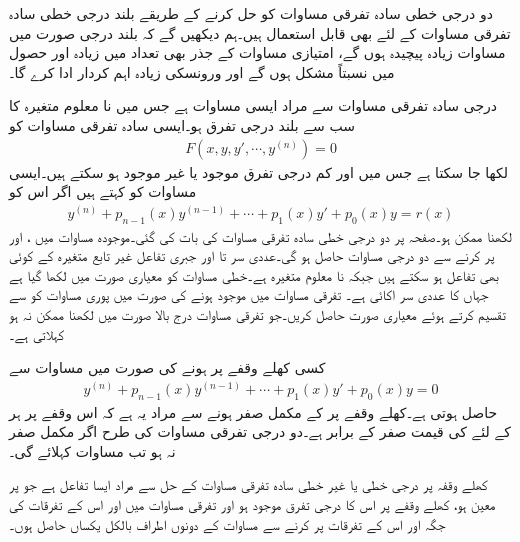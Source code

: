 دو درجی خطی سادہ تفرقی مساوات کو حل کرنے کے طریقے بلند درجی خطی سادہ تفرقی مساوات کے لئے بھی قابل استعمال ہیں۔ہم دیکھیں گے کہ بلند درجی صورت میں مساوات زیادہ پیچیدہ ہوں گے،  امتیازی مساوات کے جذر بھی تعداد میں زیادہ اور حصول میں نسبتاً مشکل ہوں گے اور ورونسکی زیادہ اہم کردار ادا کرے گا۔ 

 درجی سادہ تفرقی مساوات سے مراد ایسی مساوات ہے جس میں نا معلوم متغیرہ  کا  سب سے بلند درجی تفرق ہو۔ایسی سادہ تفرقی مساوات کو
\begin{align*}
F(x,y,y',\cdots, y^{(n)})=0
\end{align*}
لکھا جا سکتا ہے جس میں  اور کم درجی تفرق موجود یا غیر موجود ہو سکتے ہیں۔ایسی مساوات کو  کہتے ہیں اگر اس کو 
\begin{align}\label{مساوات_سادہ_بلند_خطی_الف}
y^{(n)}+p_{n-1}(x)y^{(n-1)}+\cdots+p_1(x)y'+p_0(x)y=r(x)
\end{align}
لکھنا ممکن ہو۔صفحہ  پر دو درجی خطی سادہ تفرقی مساوات کی بات کی گئی۔موجودہ مساوات میں ،  اور  پر کرنے سے دو درجی مساوات حاصل ہو گی۔عددی سر  تا   اور جبری تفاعل  غیر تابع متغیرہ   کے کوئی بھی تفاعل ہو سکتے ہیں جبکہ  نا معلوم متغیرہ ہے۔خطی مساوات کو معیاری صورت میں لکھا گیا ہے جہاں  کا عددی سر اکائی  ہے۔ تفرقی مساوات میں   موجود ہونے کی صورت میں پوری مساوات کو  سے تقسیم کرتے ہوئے معیاری صورت حاصل کریں۔جو تفرقی مساوات درج بالا صورت میں لکھنا ممکن نہ ہو  کہلاتی ہے۔

کسی کھلے وقفے  پر    ہونے کی صورت میں  مساوات  سے 
\begin{align}\label{مساوات_سادہ_بلند_خطی_ب}
y^{(n)}+p_{n-1}(x)y^{(n-1)}+\cdots+p_1(x)y'+p_0(x)y=0
\end{align}
حاصل ہوتی ہے۔کھلے وقفے پر  کے مکمل صفر ہونے سے مراد یہ ہے کہ اس وقفے پر ہر  کے لئے  کی قیمت صفر کے برابر ہے۔دو درجی تفرقی مساوات کی طرح  اگر  مکمل صفر نہ ہو تب مساوات  کہلائے گی۔

کھلے وقفہ  پر  درجی خطی یا غیر خطی سادہ تفرقی مساوات کے حل  سے مراد ایسا تفاعل ہے جو  پر معین ہو،  کھلے وقفے پر اس کا  درجی تفرق موجود ہو اور تفرقی مساوات میں  اور اس کے تفرقات کی جگہ  اور اس کے تفرقات پر کرنے سے مساوات کے دونوں اطراف بالکل یکساں حاصل ہوں۔ 

